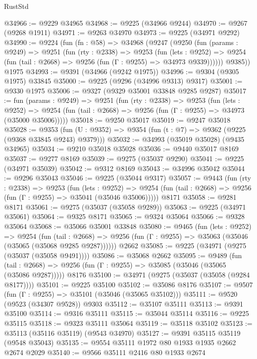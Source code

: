 \begin{lexlean}{RustStd}
\begin{coremodule}
@34966 := @9229 @34965
@34968 := @9225 (@34966 @9244)
@34970 := @9267 (@9268 @1911)
@34971 := @9263 @34970
@34973 := @9225 (@34971 @9292)
@34990 := @9224
    (fun (fn : @58) =>
    @34968
      (@9247
        (@9250
          (fun (params : @9249) =>
          @9251
            (fun (rty : @2338) =>
            @9253
              (fun (lets : @9252) =>
              @9254 (fun (tail : @2668) => @9256 (fun (Γ : @9255) => @34973 @9339))))))
        @9385))
    @1975
@34993 := @9391 (@34966 (@9242 @1975))
@34996 := @9304 (@9305 @1975) @33845
@35000 := @9225 (@9296 (@34996 @9313) @9317)
@35001 := @9330 @1975
@35006 := @9327 (@9329 @35001 @33848 @9285 @9287)
@35017 := fun (params : @9249) =>
  @9251
    (fun (rty : @2338) =>
    @9253
      (fun (lets : @9252) =>
      @9254 (fun (tail : @2668) => @9256 (fun (Γ : @9255) => @34973 (@35000 @35006)))))
@35018 := @9250 @35017
@35019 := @9247 @35018
@35028 := @9353
    (fun (U : @9352) => @9354 (fun (t : @7) => @9362 (@9225 (@9368 @33845 @9243) @9379)))
@35032 := @34993 (@35019 @35028) (@9435 @34965)
@35034 := @9210 @35018 @35028
@35036 := @9440 @35017 @8169
@35037 := @9277 @8169
@35039 := @9275 (@35037 @9290)
@35041 := @9225 (@34971 @35039)
@35042 := @9312 @8169
@35043 := @34996 @35042
@35044 := @9296 @35043
@35046 := @9225 (@35044 @9317)
@35057 := @9443
    (fun (rty : @2338) =>
    @9253
      (fun (lets : @9252) =>
      @9254 (fun (tail : @2668) => @9256 (fun (Γ : @9255) => @35041 (@35046 @35006)))))
    @8171
@35058 := @9281 @8171
@35061 := @9275 (@35037 (@35058 @9289))
@35063 := @9225 (@34971 @35061)
@35064 := @9325 @8171
@35065 := @9324 @35064
@35066 := @9328 @35064
@35068 := @35066 @35001 @33848
@35080 := @9465
    (fun (lets : @9252) =>
    @9254
      (fun (tail : @2668) =>
      @9256 (fun (Γ : @9255) => @35063 (@35046 (@35065 (@35068 @9285 @9287))))))
    @2662
@35085 := @9225 (@34971 (@9275 (@35037 (@35058 @9491))))
@35086 := @35068 @2662
@35095 := @9489
    (fun (tail : @2668) => @9256 (fun (Γ : @9255) => @35085 (@35046 (@35065 (@35086 @9287)))))
    @8176
@35100 := @34971 (@9275 (@35037 (@35058 (@9284 @8177))))
@35101 := @9225 @35100
@35102 := @35086 @8176
@35107 := @9507 (fun (Γ : @9255) => @35101 (@35046 (@35065 @35102)))
@35111 := @9520 (@9523 (@34307 @9528)) @9303
@35112 := @35107 @35111
@35113 := @9391 @35100
@35114 := @9316 @35111
@35115 := @35044 @35114
@35116 := @9225 @35115
@35118 := @9323 @35111 @35064
@35119 := @35118 @35102
@35123 := @35113 (@35116 @35119) (@9543 @34970)
@35127 := @9391 @35115 @35119 (@9548 @35043)
@35135 := @9554 @35111 @1972 @80 @1933 @1935 @2662 @2674 @2029
@35140 := @9566 @35111 @2416 @80 @1933 @2674

\end{coremodule}
\end{lexlean}
